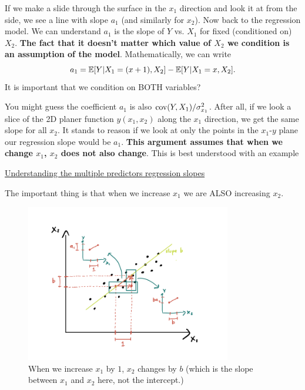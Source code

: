 If we make a slide through the surface in the $x_1$ direction and look it at from the side, we see a line with slope $a_1$ (and similarly for $x_2$).  Now back to the regression model. We can understand $a_1$ is the slope of $Y$ vs. $X_1$ for fixed (conditioned on) $X_2$. 
 {\bf The fact that it doesn't matter which value of $X_2$ we condition is an assumption of the model}.  Mathematically, we can write
 \begin{equation}
 a_1 = \mathbb E[Y|X_1 = (x+1),X_2] -  \mathbb E[Y|X_1 = x,X_2].
 \end{equation}
 It is important that we condition on BOTH variables? 
 
  You might guess the coefficient $a_1$ is also ${\rm cov}(Y,X_1)/\sigma_{x_1}^2$. After all, if we look a slice of the 2D planer function $y(x_1,x_2)$ along the $x_1$ direction, we get the same slope for all $x_2$.  It stands to reason if we look at only the points in the $x_1$-$y$ plane our regression slope would be $a_1$. {\bf This argument assumes that when we change $x_1$, $x_2$ does not also change}. This is best understood with an example
  
  \begin{example}
\href{https://colab.research.google.com/drive/1oIRgP_7-c5DGV1D2iz5nj406mZfJxUIG#scrollTo=wbeO1TS8os5J&line=15&uniqifier=1}{Understanding the multiple predictors regression slopes}
\end{example}
  
The important thing is that when we increase $x_1$ we are ALSO increasing $x_2$. 


\begin{figure}[h]
    \centering
    \includegraphics[width=0.8\textwidth]{correlated_predictors}
    \caption{When we increase $x_1$ by $1$, $x_2$ changes by $b$ (which is the slope between $x_1$ and $x_2$ here, not the intercept.) }
    \label{fig:plane}
\end{figure}



